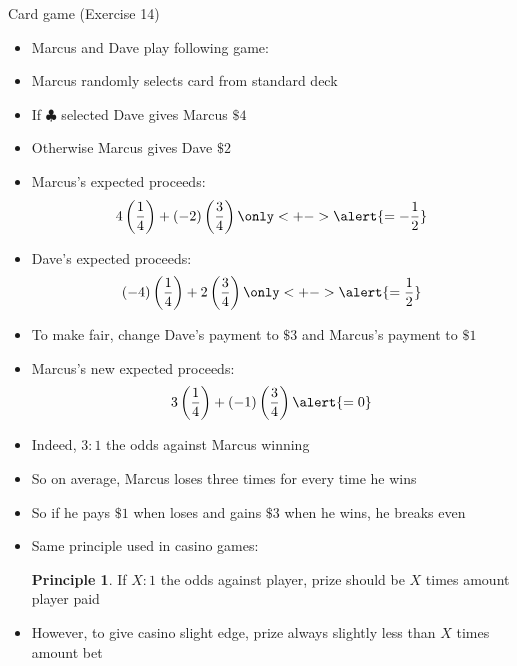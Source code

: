 \documentclass{beamer}
\theoremstyle{definition}
\newtheorem{principle}{Principle}
\begin{document}
\begin{frame}{Card game (Exercise 14)}
\begin{itemize}
\item Marcus and Dave play following game:
\item Marcus randomly selects card from standard deck
\item If $\clubsuit$ selected Dave gives Marcus $\$4$
\item Otherwise Marcus gives Dave $\$2$
\item Marcus's expected proceeds:
\[4\left(\frac{1}{4}\right)+\left(-2\right)\left(\frac{3}{4}\right)
\only<+->{\alert{=-\frac{1}{2}}}\]
\item Dave's expected proceeds:
\[\left(-4\right)\left(\frac{1}{4}\right)
+2\left(\frac{3}{4}\right)
\only<+->{\alert{=\frac{1}{2}}}\]
\end{itemize}
\end{frame}

\begin{frame}
\begin{itemize}
\item To make \alert{fair}, change Dave's payment to
\alert{$\$3$}
and Marcus's payment to \alert{$\$1$}
\item Marcus's new expected proceeds:
\[3\left(\frac{1}{4}\right)
+\left(-1\right)\left(\frac{3}{4}\right)\alert{=0}\]
\item Indeed, $3:1$ the odds against Marcus winning
\item So on average, Marcus loses three times for every
time he wins
\item So if he pays $\$1$ when loses
and gains $\$3$ when he wins, he breaks even
\item Same principle used in casino games:
\begin{principle}
If $X:1$ the
odds against player, prize \alert{should} be $X$ times
amount player paid
\end{principle}
\item However, to give casino slight edge, prize always
slightly less than $X$ times amount bet
\end{itemize}
\end{frame}
\end{document}
